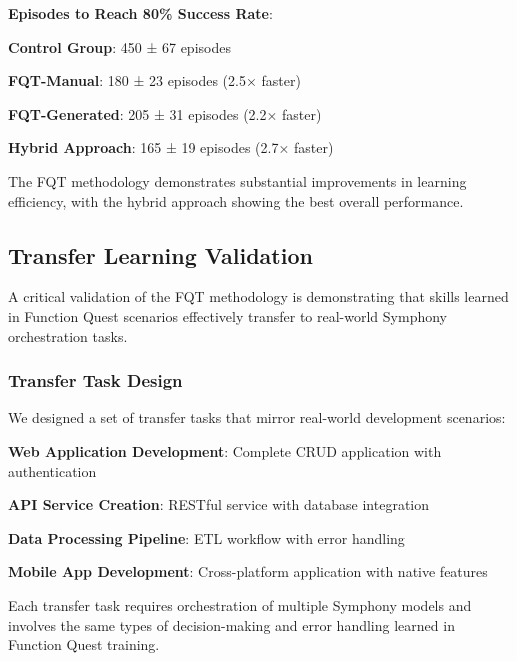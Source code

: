 \begin{infobox}[title=Learning Efficiency Comparison]
\textbf{Episodes to Reach 80\% Success Rate}:
\begin{compactlist}
    \item \textbf{Control Group}: 450 ± 67 episodes
    \item \textbf{FQT-Manual}: 180 ± 23 episodes (2.5× faster)
    \item \textbf{FQT-Generated}: 205 ± 31 episodes (2.2× faster)
    \item \textbf{Hybrid Approach}: 165 ± 19 episodes (2.7× faster)
\end{compactlist}
\end{infobox}

The FQT methodology demonstrates substantial improvements in learning efficiency, with the hybrid approach showing the best overall performance.

\subsection*{Transfer Learning Validation}

A critical validation of the FQT methodology is demonstrating that skills learned in Function Quest scenarios effectively transfer to real-world Symphony orchestration tasks.

\subsubsection*{Transfer Task Design}

We designed a set of transfer tasks that mirror real-world development scenarios:

\begin{expandedlist}
    \item \textbf{Web Application Development}: Complete CRUD application with authentication
    \item \textbf{API Service Creation}: RESTful service with database integration
    \item \textbf{Data Processing Pipeline}: ETL workflow with error handling
    \item \textbf{Mobile App Development}: Cross-platform application with native features
\end{expandedlist}

Each transfer task requires orchestration of multiple Symphony models and involves the same types of decision-making and error handling learned in Function Quest training.

